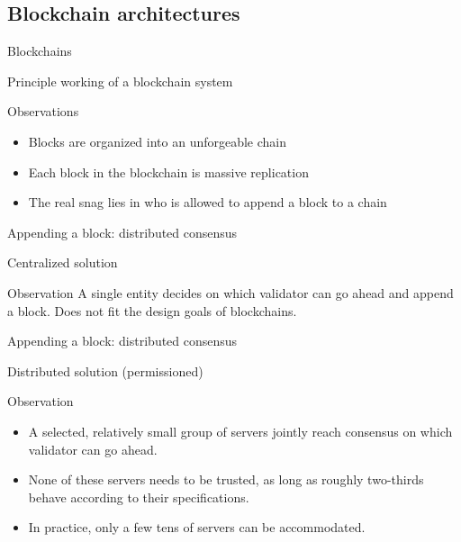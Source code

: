 \subsection{Blockchain architectures}
\begin{slide}{Blockchains}
  \begin{block}{Principle working of a blockchain system}
    \centering{}
  \end{block}
  \begin{block}{Observations}
    \begin{itemize}\firmlist
    \item Blocks are organized into an unforgeable  chain
    \item Each block in the blockchain is  \mathexpr{\Rightarrow} massive replication
    \item The real snag lies in who is allowed to append a block to a chain
    \end{itemize}
    
  \end{block}
\end{slide}
\begin{slide}{Appending a block: distributed consensus}
  \begin{block}{Centralized solution}
    \begin{centerfig}
    \end{centerfig}
  \end{block}
  \begin{block}{Observation}
    A single entity decides on which validator can go ahead and append a block. Does not fit the design goals
    of blockchains.
  \end{block}
\end{slide}
\begin{slide}{Appending a block: distributed consensus}
  \begin{block}{Distributed solution (permissioned)}
    \begin{centerfig}
    \end{centerfig}
  \end{block}
  \begin{block}{Observation}
    \begin{itemize}\firmlist
    \item A selected, relatively small group of servers jointly reach consensus on which validator can go
      ahead.
    \item None of these servers needs to be trusted, as long as roughly two-thirds behave according to their
      specifications.
    \item In practice, only a few tens of servers can be accommodated.
    \end{itemize}
  \end{block}
\end{slide}
